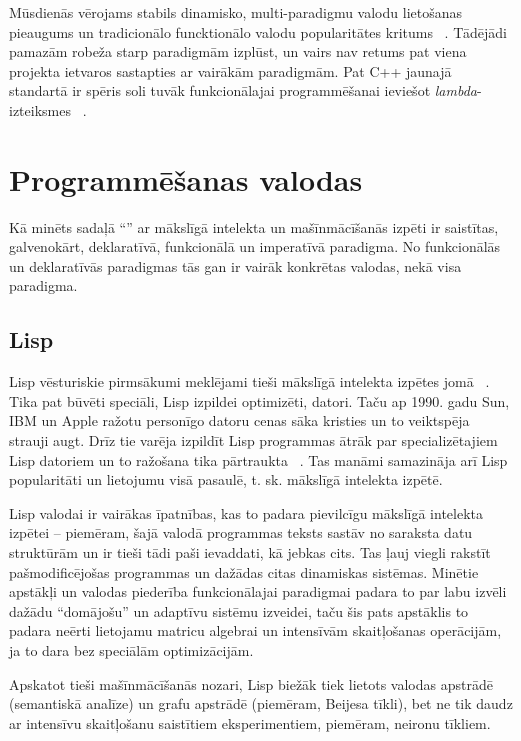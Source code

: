 \documentclass{ludis}
\begin{document}
Mūsdienās vērojams stabils dinamisko, multi-paradigmu valodu lietošanas pieaugums un tradicionālo funcktionālo valodu popularitātes kritums ~\cite{tiobe_index}. Tādējādi pamazām robeža starp paradigmām izplūst, un vairs nav retums pat viena projekta ietvaros sastapties ar vairākām paradigmām. Pat C++ jaunajā standartā ir spēris soli tuvāk funkcionālajai programmēšanai ieviešot {\em lambda}-izteiksmes ~\cite{iso_cpp11}.

\section{Programmēšanas valodas} \label{sec:languages}
Kā minēts sadaļā ``'' ar mākslīgā intelekta un mašīnmācīšanās izpēti ir saistītas, galvenokārt, deklaratīvā, funkcionālā un imperatīvā paradigma. No funkcionālās un deklaratīvās paradigmas tās gan ir vairāk konkrētas valodas, nekā visa paradigma.

\subsection{Lisp}
Lisp vēsturiskie pirmsākumi meklējami tieši mākslīgā intelekta izpētes jomā ~\cite{hist_lisp}. Tika pat būvēti speciāli, Lisp izpildei optimizēti, datori. Taču ap 1990. gadu Sun, IBM un Apple ražotu personīgo datoru cenas sāka kristies un to veiktspēja strauji augt. Drīz tie varēja izpildīt Lisp programmas ātrāk par specializētajiem Lisp datoriem un to ražošana tika pārtraukta ~\cite[p.~209--210]{crevier_1993}. Tas manāmi samazināja arī Lisp popularitāti un lietojumu visā pasaulē, t. sk. mākslīgā intelekta izpētē.

Lisp valodai ir vairākas īpatnības, kas to padara pievilcīgu mākslīgā intelekta izpētei -- piemēram, šajā valodā programmas teksts sastāv no saraksta datu struktūrām un ir tieši tādi paši ievaddati, kā jebkas cits. Tas ļauj viegli rakstīt pašmodificējošas programmas un dažādas citas dinamiskas sistēmas. Minētie apstākļi un valodas piederība funkcionālajai paradigmai padara to par labu izvēli dažādu ``domājošu'' un adaptīvu sistēmu izveidei, taču šis pats apstāklis to padara neērti lietojamu matricu algebrai un intensīvām skaitļošanas operācijām, ja to dara bez speciālām optimizācijām.

Apskatot tieši mašīnmācīšanās nozari, Lisp biežāk tiek lietots valodas apstrādē (semantiskā analīze) un grafu apstrādē (piemēram, Beijesa tīkli), bet ne tik daudz ar intensīvu skaitļošanu saistītiem eksperimentiem, piemēram, neironu tīkliem.
\end{document}
